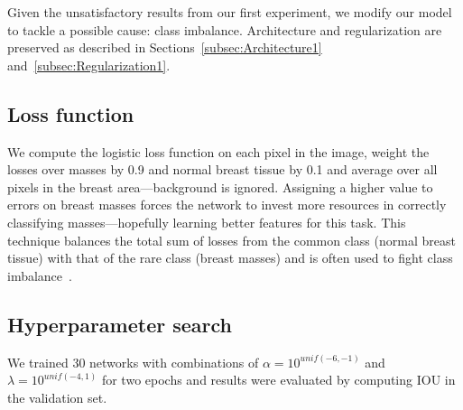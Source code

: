 Given the unsatisfactory results from our first experiment, we modify our model to tackle a possible cause: class imbalance. Architecture and regularization are preserved as described in Sections~\ref{subsec:Architecture1} and~\ref{subsec:Regularization1}.

\subsection{Loss function}
We compute the logistic loss function on each pixel in the image, weight the losses over masses by 0.9 and normal breast tissue by 0.1 and average over all pixels in the breast area---background is ignored. Assigning a higher value to errors on breast masses forces the network to invest more resources in correctly classifying masses---hopefully learning better features for this task.
This technique balances the total sum of losses from the common class (normal breast tissue) with that of the rare class (breast masses) and is often used to fight class imbalance~\cite{Provost2000}.

\subsection{Hyperparameter search}
We trained 30 networks with combinations of $\alpha = 10^{unif(-6, -1)}$ and $\lambda = 10^{unif(-4, 1)}$ for two epochs and results were evaluated by computing IOU in the validation set.
